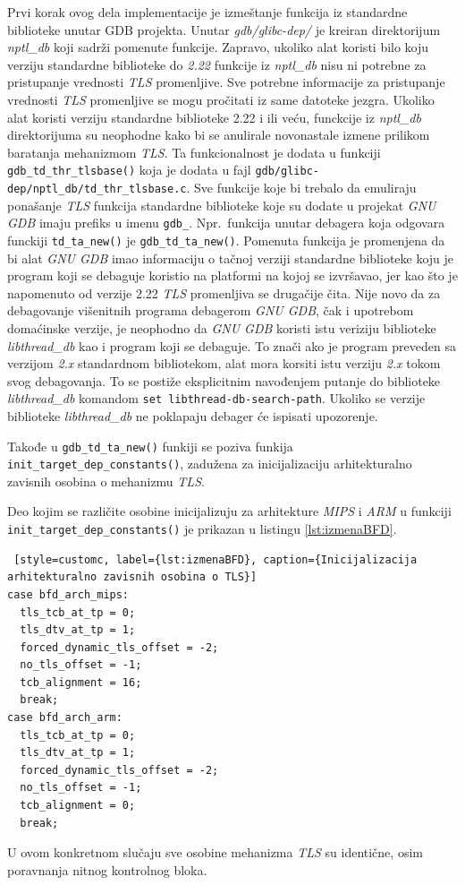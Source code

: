 \documentclass[12pt,oneside]{memoir}
\begin{document}
Prvi korak ovog dela implementacije je izmeštanje funkcija iz standardne biblioteke unutar GDB projekta. Unutar \emph{gdb/glibc-dep/} je kreiran direktorijum \emph{nptl\_db} koji sadrži pomenute funkcije. Zapravo, ukoliko alat koristi bilo koju verziju standardne biblioteke do \emph{2.22} funkcije iz \emph{nptl\_db} nisu ni potrebne za pristupanje vrednosti \emph{TLS} promenljive. Sve potrebne informacije za pristupanje vrednosti \emph{TLS} promenljive se mogu pročitati iz same datoteke jezgra. Ukoliko alat koristi verziju standardne biblioteke 2.22 i ili veću, funckcije iz \emph{nptl\_db} direktorijuma su neophodne kako bi se anulirale novonastale izmene prilikom baratanja mehanizmom \emph{TLS}. Ta funkcionalnost je dodata u funkciji \texttt{gdb\_td\_thr\_tlsbase()} koja je dodata u fajl \texttt{gdb/glibc-dep/nptl\_db/td\_thr\_tlsbase.c}.
Sve funkcije koje bi trebalo da emuliraju ponašanje \emph{TLS} funkcija standardne biblioteke koje su dodate u projekat \emph{GNU GDB} imaju prefiks u imenu \texttt{gdb\_}. Npr.~funkcija unutar debagera koja odgovara funckiji \texttt{td\_ta\_new()} je \texttt{gdb\_td\_ta\_new()}. Pomenuta funkcija je promenjena da bi alat \emph{GNU GDB} imao informaciju o tačnoj verziji standardne biblioteke koju je program koji se debaguje koristio na platformi na kojoj se izvršavao, jer kao što je napomenuto od verzije 2.22 \emph{TLS} promenljiva se drugačije čita. Nije novo da za debagovanje višenitnih programa debagerom \emph{GNU GDB}, čak i upotrebom domaćinske verzije, je neophodno da \emph{GNU GDB} koristi istu veriziju biblioteke \emph{libthread\_db} kao i program koji se debaguje. To znači ako je program preveden sa verzijom \emph{2.x} standardnom bibliotekom, alat mora korsiti istu verziju \emph{2.x} tokom svog debagovanja. To se postiže eksplicitnim navođenjem putanje do biblioteke \emph{libthread\_db} komandom \texttt{set libthread-db-search-path}. Ukoliko se verzije biblioteke \emph{libthread\_db} ne poklapaju debager će ispisati upozorenje.

Takođe u \texttt{gdb\_td\_ta\_new()} funkiji se poziva funkija \texttt{init\_target\_dep\_constants()}, zadužena za inicijalizaciju arhitekturalno zavisnih osobina o mehanizmu \emph{TLS}.

Deo kojim se različite osobine inicijalizuju za arhitekture \emph{MIPS} i \emph{ARM} u funkciji \texttt{init\_target\_dep\_constants()} je prikazan u listingu \ref{lst:izmenaBFD}.
\begin{lstlisting} [style=customc, label={lst:izmenaBFD}, caption={Inicijalizacija arhitekturalno zavisnih osobina o TLS}]
case bfd_arch_mips:
  tls_tcb_at_tp = 0;
  tls_dtv_at_tp = 1;
  forced_dynamic_tls_offset = -2;
  no_tls_offset = -1;
  tcb_alignment = 16;
  break;
case bfd_arch_arm:
  tls_tcb_at_tp = 0;
  tls_dtv_at_tp = 1;
  forced_dynamic_tls_offset = -2;
  no_tls_offset = -1;
  tcb_alignment = 0;
  break;
\end{lstlisting}
U ovom konkretnom slučaju sve osobine mehanizma \emph{TLS} su identične, osim poravnanja nitnog kontrolnog bloka.
\end{document}
